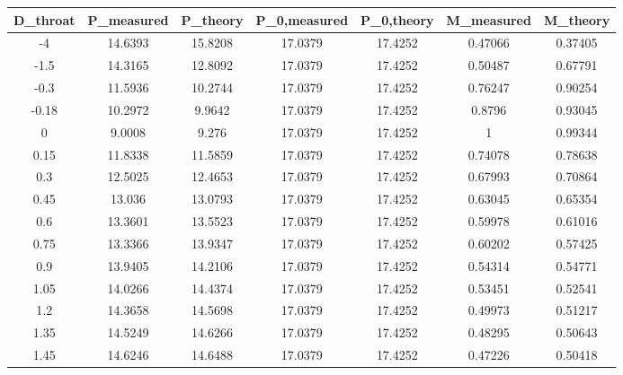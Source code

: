 \begin{tabular}{ccccccc}
\toprule
D_{throat} & P_{measured} & P_{theory} & P_{0,measured} & P_{0,theory} & M_{measured} & M_{theory} \\
\midrule
-4 & 14.6393 & 15.8208 & 17.0379 & 17.4252 & 0.47066 & 0.37405 \\ 
-1.5 & 14.3165 & 12.8092 & 17.0379 & 17.4252 & 0.50487 & 0.67791 \\ 
-0.3 & 11.5936 & 10.2744 & 17.0379 & 17.4252 & 0.76247 & 0.90254 \\ 
-0.18 & 10.2972 & 9.9642 & 17.0379 & 17.4252 & 0.8796 & 0.93045 \\ 
0 & 9.0008 & 9.276 & 17.0379 & 17.4252 & 1 & 0.99344 \\ 
0.15 & 11.8338 & 11.5859 & 17.0379 & 17.4252 & 0.74078 & 0.78638 \\ 
0.3 & 12.5025 & 12.4653 & 17.0379 & 17.4252 & 0.67993 & 0.70864 \\ 
0.45 & 13.036 & 13.0793 & 17.0379 & 17.4252 & 0.63045 & 0.65354 \\ 
0.6 & 13.3601 & 13.5523 & 17.0379 & 17.4252 & 0.59978 & 0.61016 \\ 
0.75 & 13.3366 & 13.9347 & 17.0379 & 17.4252 & 0.60202 & 0.57425 \\ 
0.9 & 13.9405 & 14.2106 & 17.0379 & 17.4252 & 0.54314 & 0.54771 \\ 
1.05 & 14.0266 & 14.4374 & 17.0379 & 17.4252 & 0.53451 & 0.52541 \\ 
1.2 & 14.3658 & 14.5698 & 17.0379 & 17.4252 & 0.49973 & 0.51217 \\ 
1.35 & 14.5249 & 14.6266 & 17.0379 & 17.4252 & 0.48295 & 0.50643 \\ 
1.45 & 14.6246 & 14.6488 & 17.0379 & 17.4252 & 0.47226 & 0.50418 \\ 
\bottomrule
\end{tabular}